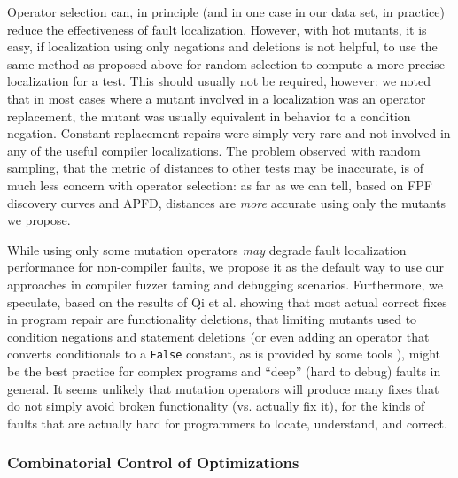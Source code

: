 Operator selection can, in principle (and in one case in our data set, in practice) reduce the effectiveness of fault localization.  However, with hot mutants, it is easy, if localization using only negations and deletions is not helpful, to use the same method as proposed above for random selection to compute a more precise localization for a test.  This should usually not be required, however:  we noted that in most cases where a mutant involved in a localization was an operator replacement, the mutant was usually equivalent in behavior to a condition negation.  Constant replacement repairs were simply very rare and not involved in any of the useful compiler localizations.  The problem observed with random sampling, that the metric of distances to other tests may be inaccurate, is of much less concern with operator selection:  as far as we can tell, based on FPF discovery curves and APFD, distances are \emph{more} accurate using only the mutants we propose.

While using only some mutation operators \emph{may} degrade fault localization performance for non-compiler faults, we propose it as the default way to use our approaches in compiler fuzzer taming  and debugging scenarios.  Furthermore, we speculate, based on the results of Qi et al. \cite{achour} showing that most actual correct fixes in program repair are functionality deletions, that limiting mutants used to condition negations and statement deletions (or even adding an operator that converts conditionals to a {\tt False} constant, as is provided by some tools \cite{RegExpMut}), might be the best practice for complex programs and ``deep'' (hard to debug) faults in general.  It seems unlikely that mutation operators will produce many fixes that do not simply avoid broken functionality (vs. actually fix it), for the kinds of faults that are actually hard for programmers to locate, understand, and correct.

\subsubsection{Combinatorial Control of Optimizations}

